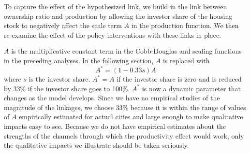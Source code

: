 
To capture the effect of the hypothesized link, we build in the link between ownership ratio and production by allowing the investor share of the housing stock to negatively affect the scale term $A$ in the production function. We then re-examine the effect of the policy interventions with these links in place. 



$A$ is the multiplicative constant term in the Cobb-Douglas and scaling functions in the preceding analyses. In the following section, $A$  is replaced with   
\[A^*= (1-0.33s)A\]
where $s$ is the investor share. $A^*= A$ if the investor share is zero and is reduced by 33\% if the investor share goes to 100\%. $A^*$ is now a dynamic parameter that changes as the model develops. Since we have no empirical studies of the magnitude of the linkages, we choose 33\% because it is within the range of values of $A$ empirically estimated for actual cities and large enough to make qualitative impacts easy to see. Because we do not have empirical estimates about the strengths of the channels through which the productivity effect would work, only the qualitative impacts we illustrate should be taken seriously.  



